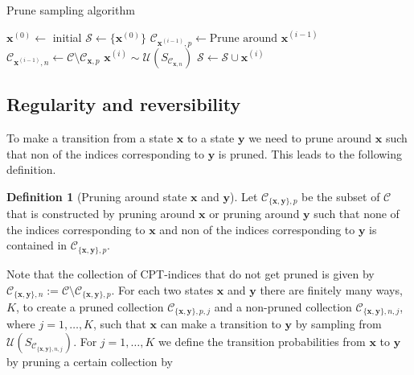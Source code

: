 \documentclass[a4paper, twoside, 11pt]{report}
\theoremstyle{plain}
\theoremstyle{definition}
\newtheorem{definition}[thm]{Definition}
\theoremstyle{remark}
\newcommand{\C}{{\mathcal C}}
\newcommand{\U}{{\mathcal{U}}}
\newcommand{\bfx}{{\mathbf{x}}}
\newcommand{\bfy}{{\mathbf{y}}}
\begin{document}
\begin{algorithm}[t!]
\caption{Prune sampling algorithm}
\label{prunealg}
\begin{algorithmic}
\State $\mathbf{x}^{(0)} \gets $ initial
     \State $\mathcal{S} \gets \{\mathbf{x}^{(0)}\}$
     \State $\mathcal{C}_{\mathbf{x}^{(i-1)}, {p}} \gets \text{Prune around } \mathbf{x}^{(i-1)}$ \\ 
	\State $\mathcal{C}_{\mathbf{x}^{(i-1)}, {n}} \gets \mathcal{C} \setminus \mathcal{C}_{\mathbf{x}, {p}}$  
     \State $\mathbf{x}^{(i)} \sim  \mathcal{U}(S_{\mathcal{C}_{\mathbf{x}, n}}) $ 
     \State $\mathcal{S} \gets \mathcal{S} \cup \mathbf{x}^{(i)}$
     \EndFor
     \State {}
\EndFunction
\end{algorithmic}
\end{algorithm}



\subsection{Regularity and reversibility}
To make a transition from a state $\bfx$ to a state $\bfy$ we need to prune around $\bfx$ such that non of the indices corresponding to $\bfy$ is pruned. This leads to the following definition. 

\begin{definition}[Pruning around state $\bfx$ and $\bfy$]
Let $\mathcal{C}_{\{\mathbf{x}, \mathbf{y}\}, {p}}$ be the subset of $\mathcal{C}$ that is constructed by pruning around $\mathbf{x}$ or pruning around $\mathbf{y}$ such that none of the indices corresponding to $\mathbf{x}$ and non of the indices corresponding to $\mathbf{y}$ is contained in $\mathcal{C}_{\{\mathbf{x}, \mathbf{y}\}, {p}}$.
\end{definition}
Note that the collection of CPT-indices that do not get pruned is given by $\C_{\{\bfx, \bfy \}, n} := \C \setminus \C_{\{ \bfx, \bfy \}, p}$. For each two states $\bfx$ and $\bfy$ there are finitely many ways, $K$, to create a pruned collection $\C_{\{\bfx, \bfy\}, p, j}$ and a non-pruned collection $\C_{\{\bfx, \bfy \}, n, j}$, where $j =1,\ldots, K$, such that $\bfx$ can make a transition to $\bfy$ by sampling from $\U(S_{\C_{\{\bfx, \bfy \}, n, j}})$. For $j =1, \ldots, K$ we define the transition probabilities from $\bfx$ to $\bfy$ by pruning a certain collection by
\end{document}

